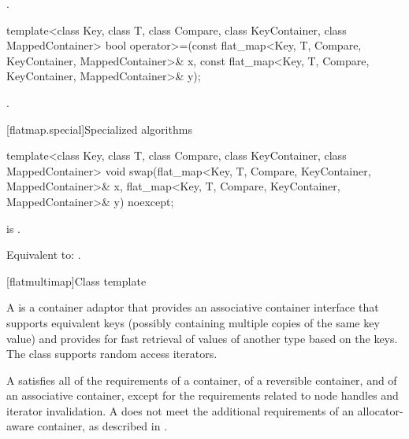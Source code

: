 \begin{codeblock}
\begin{codeblock}
\begin{codeblock}
\begin{addedblock}
\begin{itemdescr}
\pnum \returns {}.
\end{itemdescr}

%
\begin{itemdecl}
template<class Key, class T, class Compare, class KeyContainer, class MappedContainer>
  bool operator>=(const flat_map<Key, T, Compare, KeyContainer, MappedContainer>& x,
                  const flat_map<Key, T, Compare, KeyContainer, MappedContainer>& y);
\end{itemdecl}

\begin{itemdescr}
\pnum \returns {}.
\end{itemdescr}

[flatmap.special]{Specialized algorithms}

%
\begin{itemdecl}
template<class Key, class T, class Compare, class KeyContainer, class MappedContainer>
  void swap(flat_map<Key, T, Compare, KeyContainer, MappedContainer>& x,
            flat_map<Key, T, Compare, KeyContainer, MappedContainer>& y) noexcept;
\end{itemdecl}

\begin{itemdescr}
\pnum \constraints {}
is .

\pnum
\effects Equivalent to: .
\end{itemdescr}

[flatmultimap]{Class template }

\pnum
{}%
A  is a container adaptor that provides an associative
container interface that supports equivalent keys (possibly containing
multiple copies of the same key value) and provides for fast retrieval of
values of another type  based on the keys. The 
class supports random access iterators.

\pnum
A  satisfies all of the requirements of a container, of a
reversible container, and of an associative
container, except for the requirements related to
node handles and iterator
invalidation.  A  does
not meet the additional requirements of an allocator-aware container, as
described in .


\end{addedblock}
\end{codeblock}
\end{codeblock}
\end{codeblock}
